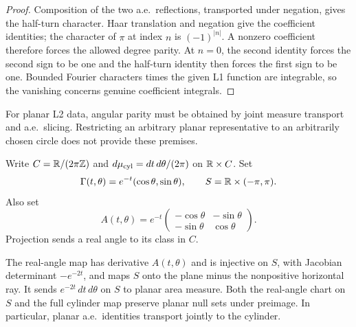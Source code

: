 \begin{proof}
\leanok
Composition of the two a.e.\ reflections, transported under negation, gives
the half-turn character. Haar translation and negation give the coefficient
identities; the character of $\pi$ at index $n$ is $(-1)^{|n|}$.
A nonzero coefficient therefore forces the allowed degree parity.
At $n=0$, the second identity forces the second sign to be one and the
half-turn identity then forces the first sign to be one.
Bounded Fourier characters times the given L1 function are integrable,
so the vanishing concerns genuine coefficient integrals.
\end{proof}

\begin{remark}
For planar L2 data, angular parity must be obtained by joint measure transport
and a.e.\ slicing. Restricting an arbitrary planar representative to an
arbitrarily chosen circle does not provide these premises.
\end{remark}

\begin{definition}
\label{def:log-cylinder-coordinates}
\leanok
Write $C=\mathbb{R}/(2\pi\mathbb{Z})$ and $d\mu_{\rm cyl}=dt\,d\theta/(2\pi)$ on $\mathbb{R}\times C$.
Set
\[
 \Gamma(t,\theta)=e^{-t}(\cos\theta,\sin\theta),\qquad
 S=\mathbb{R}\times(-\pi,\pi).
\]
Also set
\[
 A(t,\theta)=e^{-t}
 \begin{pmatrix}-\cos\theta&-\sin\theta\\-\sin\theta&\cos\theta\end{pmatrix}.
\]
Projection sends a real angle to its class in $C$.
\end{definition}

\begin{lemma}
\label{lem:log-cylinder-measure}
\leanok
The real-angle map has derivative $A(t,\theta)$ and is injective on $S$,
with Jacobian determinant $-e^{-2t}$,
and maps $S$ onto the plane minus the nonpositive horizontal ray.
It sends $e^{-2t}\,dt\,d\theta$ on $S$ to planar area measure.
Both the real-angle chart on $S$ and the full cylinder map preserve planar
null sets under preimage. In particular, planar a.e.\ identities transport
jointly to the cylinder.
\end{lemma}

